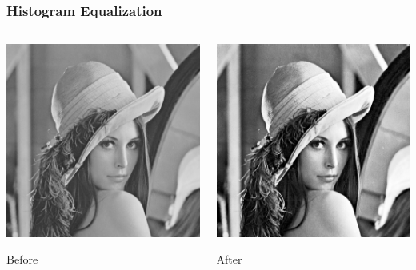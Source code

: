 \begin{frame}
    \frametitle{Histogram Equalization}
    \begin{columns}[T, onlytextwidth]
        \begin{column}{0.5\textwidth}\centering
            \includegraphics[height=0.7\textheight]{img/lena_bw}

            Before
        \end{column}
        \begin{column}{0.5\textwidth}\centering
            \includegraphics[height=0.7\textheight]{img/lena_histeq}

            After
        \end{column}
    \end{columns}
\end{frame}

